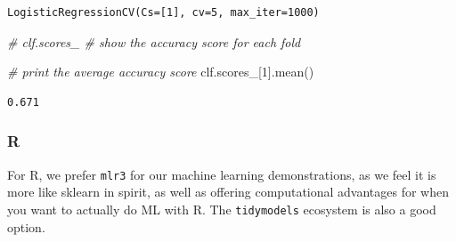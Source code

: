 \documentclass[
  letterpaper,
]{krantz}
\newenvironment{Shaded}{}{}
\newcommand{\CommentTok}[1]{\textcolor[rgb]{0.38,0.63,0.69}{\textit{#1}}}
\newcommand{\DecValTok}[1]{\textcolor[rgb]{0.25,0.63,0.44}{#1}}
\newcommand{\NormalTok}[1]{#1}
\begin{document}
\begin{verbatim}
LogisticRegressionCV(Cs=[1], cv=5, max_iter=1000)
\end{verbatim}

\begin{Shaded}
\begin{Highlighting}[]
\CommentTok{\# clf.scores\_  \# show the accuracy score for each fold}

\CommentTok{\# print the average accuracy score}
\NormalTok{clf.scores\_[}\DecValTok{1}\NormalTok{].mean()}
\end{Highlighting}
\end{Shaded}

\begin{verbatim}
0.671
\end{verbatim}

\subsubsection{R}

For R, we prefer \texttt{mlr3} for our machine learning demonstrations,
as we feel it is more like sklearn in spirit, as well as offering
computational advantages for when you want to actually do ML with R. The
\texttt{tidymodels} ecosystem is also a good option.
\end{document}
